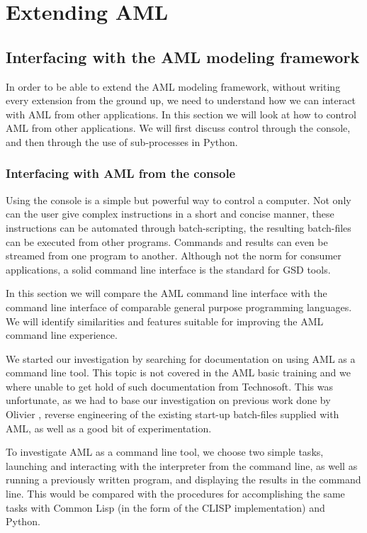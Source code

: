 
\section{Extending AML} %
\label{sec:extending_aml}

\subsection{Interfacing with the AML modeling framework} %
\label{sub:interfacing_with_the_aml_modeling_framework}
In order to be able to extend the AML modeling framework, without writing every extension from the ground up, we need to understand how we can interact with AML from other applications. In this section we will look at how to control AML from other applications. We will first discuss control through the console, and then through the use of sub-processes in Python.

\subsubsection{Interfacing with AML from the console} %
\label{ssub:interfacing_with_aml_from_the_console}
Using the console is a simple but powerful way to control a computer. Not only can the user give complex instructions in a short and concise manner, these instructions can be automated through batch-scripting, the resulting batch-files can be executed from other programs. Commands and results can even be streamed from one program to another. Although not the norm for consumer applications, a solid command line interface is the standard for GSD tools.

In this section we will compare the AML command line interface with the command line interface of comparable general purpose programming languages. We will identify similarities and features suitable for improving the AML command line experience.

We started our investigation by searching for documentation on using AML as a command line tool. This topic is not covered in the AML basic training \citep{aml_ref} and we where unable to get hold of such documentation from Technosoft. This was unfortunate, as we had to base our investigation on previous work done by Olivier \citep{olivier}, reverse engineering of the existing start-up batch-files supplied with AML, as well as a good bit of experimentation.

To investigate AML as a command line tool, we choose two simple tasks, launching and interacting with the interpreter from the command line, as well as running a previously written program, and displaying the results in the command line. This would be compared with the procedures for accomplishing the same tasks with Common Lisp (in the form of the CLISP implementation) and Python.

